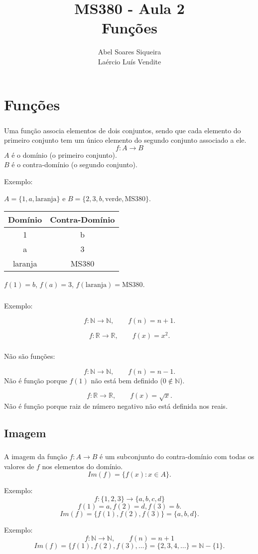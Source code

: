 \documentclass[10 pt]{beamer}
\title{ MS380 - Aula 2 \\
Funções}
\author{Abel Soares Siqueira \\
Laércio Luís Vendite}
\date{}
\newcommand{\makesection}[1]{\section[#1]{#1}}
\newcommand{\makesubsection}[1]{\subsection[#1]{#1}}
\newcommand{\myframe}[1]{
\begin{frame}
 \frametitle{\insertsection \qquad {\small \insertsubsection}}
#1
\end{frame}}
\begin{document}
\begin{frame}
 \titlepage
\end{frame}

\makesection{Funções}

\myframe {
  Uma função associa elementos de dois conjuntos, sendo que cada
  elemento do primeiro conjunto tem um único elemento do segundo
  conjunto associado a ele.
  \pause
  $$f:A\rightarrow B$$
  \pause
  $A$ é o domínio (o primeiro conjunto). \\
  \pause
  $B$ é o contra-domínio (o segundo conjunto).

  Exemplo:

  $A = \{1,a,\mbox{laranja}\}$ e $B = \{2,3,b,\mbox{verde},\mbox{MS380}\}$.

  \begin{center}
    \begin{tabular}{c|c}
      {\bf Domínio} & {\bf Contra-Domínio} \\ \hline
      1 & b \\
      a & 3 \\
      \mbox{laranja} & \mbox{MS380}
    \end{tabular}
  \end{center}

  $f(1) = b$, $f(a) = 3$, $f(\mbox{laranja}) = \mbox{MS380}$.
}

\myframe {
  Exemplo:

  $$f:\mathbb{N}\rightarrow\mathbb{N}, \qquad f(n) = n + 1.$$

  $$f:\mathbb{R}\rightarrow\mathbb{R}, \qquad f(x) = x^2.$$

}

\myframe {
  {\color{red} Não são funções:}

  $$f:\mathbb{N}\rightarrow\mathbb{N}, \qquad f(n) = n - 1.$$
  Não é função porque $f(1)$ não está bem definido ($0 \not\in \mathbb{N}$).

  $$f:\mathbb{R}\rightarrow\mathbb{R}, \qquad f(x) = \sqrt{x}.$$
  Não é função porque raiz de número negativo não está definida nos reais.
}

\makesubsection{Imagem}

\myframe {
  A imagem da função $f:A\rightarrow B$ é um subconjunto do contra-domínio com todas os
  valores de $f$ nos elementos do domínio.
  $$ Im(f) = \{ f(x) : x \in A \}. $$

Exemplo:
  $$ f:\{1,2,3\}\rightarrow\{a,b,c,d\} $$
  $$ f(1) = a, f(2) = d, f(3) = b. $$
  $$ Im(f) = \{f(1),f(2),f(3)\} = \{a,b,d\}. $$

Exemplo:
  $$ f:\mathbb{N}\rightarrow\mathbb{N}, \qquad f(n) = n + 1 $$
  $$ Im(f) = \{f(1),f(2),f(3),\dots\} = \{2,3,4,\dots\} = \mathbb{N}-\{1\}.$$
}
\end{document}
